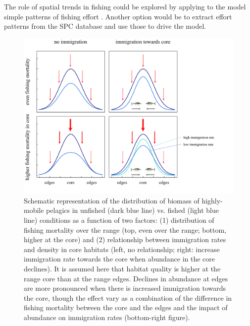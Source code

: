 \documentclass{article}
\begin{document}
The role of spatial trends in fishing could be explored by applying to
the model simple patterns of fishing effort \citep[as in, for
e.g.][]{Swain1994_a}. Another option would be to extract effort
patterns from the SPC database and use those to drive the model.

\begin{figure}
\includegraphics[scale=0.75]{LTB_ResProposal_2013_Chap3_Diagram2.png}
\caption{Schematic representation of the distribution of biomass of
  highly-mobile pelagics in unfished (dark blue line) vs. fished
  (light blue line) conditions as a function of two factors: (1)
  distribution of fishing mortality over
  the range (top, even over the range; bottom, higher at the core) and
  (2) relationship between immigration rates and density in core
  habitats (left, no relationship; right: increase immigration rate
  towards the core when abundance in the core declines). It is assumed
  here that habitat quality is higher at the range core than at the
  range edges. Declines in
  abundance at edges are more
  pronounced when there is increased immigration towards the core,
  though the effect vary as a combination of the difference in
  fishing mortality between the core and the edges and the impact of
  abundance on immigration rates (bottom-right figure).
\label{chap3diag2}
}
\end{figure}


\end{document}

